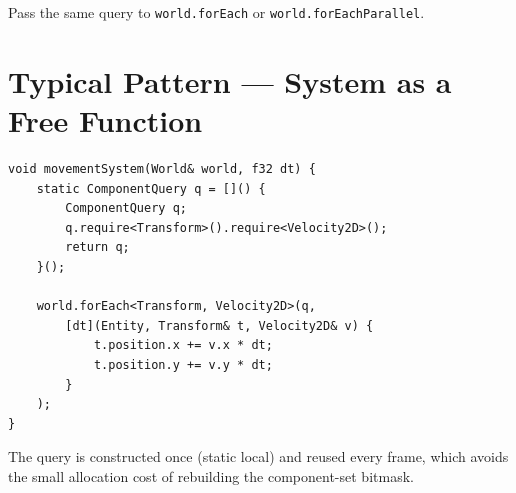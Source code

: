 Pass the same query to \texttt{world.forEach} or \texttt{world.forEachParallel}.

\section{Typical Pattern — System as a Free Function}

\begin{lstlisting}
void movementSystem(World& world, f32 dt) {
    static ComponentQuery q = []() {
        ComponentQuery q;
        q.require<Transform>().require<Velocity2D>();
        return q;
    }();

    world.forEach<Transform, Velocity2D>(q,
        [dt](Entity, Transform& t, Velocity2D& v) {
            t.position.x += v.x * dt;
            t.position.y += v.y * dt;
        }
    );
}
\end{lstlisting}

The query is constructed once (static local) and reused every frame, which
avoids the small allocation cost of rebuilding the component-set bitmask.
